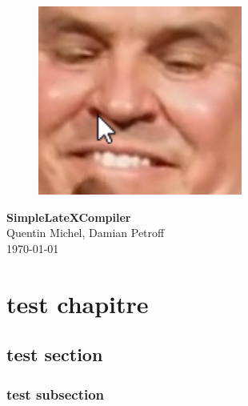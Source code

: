 \documentclass[a4paper,10pt,openany,oneside]{report}
\begin{document}
\begin{figure}
\centering
\vspace*{1cm}
\includegraphics[width=0.6\textwidth]{img/example.png}
\end{figure}
\vspace*{3cm}
\begin{center}
\textbf{\Huge{SimpleLateXCompiler}} \\[1cm]
{\Large Quentin Michel, Damian Petroff} \\[5cm]
\today
\end{center}
\tableofcontents
\chapter{test chapitre}
\section{test section}
\subsection{test subsection}
\end{document}
